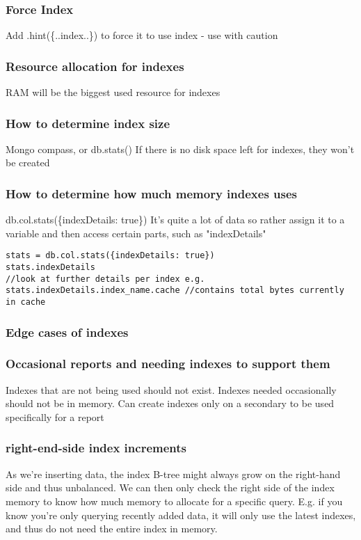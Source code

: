 \documentclass[11pt]{article}
\begin{document}
\subsubsection{Force Index}
\label{sec:org61f86a7}
Add .hint(\{..index..\}) to force it to use index - use with caution

\subsubsection{Resource allocation for indexes}
\label{sec:org7c0d5b4}
RAM will be the biggest used resource for indexes

\subsubsection{How to determine index size}
\label{sec:org93405a8}
Mongo compass, or db.stats()
If there is no disk space left for indexes, they won't be created

\subsubsection{How to determine how much memory indexes uses}
\label{sec:orgc0300f4}
db.col.stats(\{indexDetails: true\})
It's quite a lot of data so rather assign it to a variable and then access certain parts, such as "indexDetails"
\begin{verbatim}
stats = db.col.stats({indexDetails: true})
stats.indexDetails
//look at further details per index e.g.
stats.indexDetails.index_name.cache //contains total bytes currently in cache
\end{verbatim}

\subsubsection{Edge cases of indexes}
\label{sec:orgb732113}
\subsubsection{Occasional reports and needing indexes to support them}
\label{sec:org2aff24a}
Indexes that are not being used should not exist. Indexes needed occasionally should not be in memory.
Can create indexes only on a secondary to be used specifically for a report

\subsubsection{right-end-side index increments}
\label{sec:org3743f2c}
As we're inserting data, the index B-tree might always grow on the right-hand side and thus unbalanced.
We can then only check the right side of the index memory to know how much memory to allocate for a specific query. E.g. if you know you're only querying recently added data, it will only use the latest indexes, and thus do not need the entire index in memory.
\end{document}

